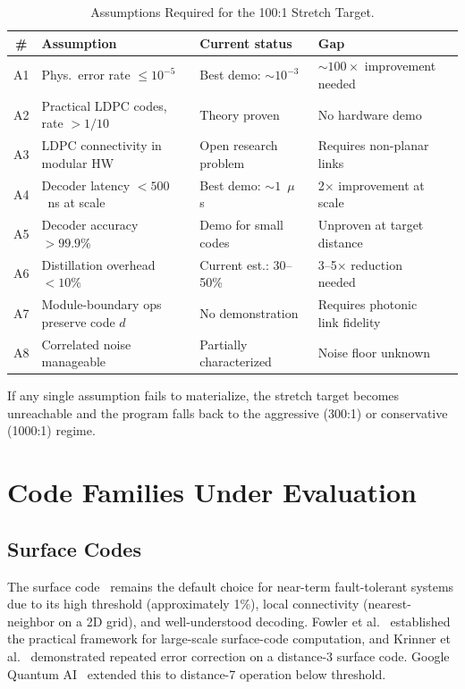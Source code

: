 \documentclass[conference]{IEEEtran}
\begin{document}
\begin{table}[htbp]
\centering
\caption{Assumptions Required for the 100:1 Stretch Target.}
\label{tab:assumptions}
\begin{tabular}{clllp{3cm}}
\toprule
\textbf{\#} & \textbf{Assumption} & \textbf{Current status} & \textbf{Gap} \\
\midrule
A1 & Phys.\ error rate $\leq 10^{-5}$ & Best demo: ${\sim}10^{-3}$~\cite{googleqai2024, krinner2022} & ${\sim}100\times$ improvement needed \\
A2 & Practical LDPC codes, rate $> 1/10$ & Theory proven~\cite{panteleev2022} & No hardware demo \\
A3 & LDPC connectivity in modular HW & Open research problem & Requires non-planar links \\
A4 & Decoder latency $< 500$~ns at scale & Best demo: ${\sim}1$~$\mu$s~\cite{googleqai2024} & 2$\times$ improvement at scale \\
A5 & Decoder accuracy $> 99.9\%$ & Demo for small codes~\cite{krinner2022} & Unproven at target distance \\
A6 & Distillation overhead $< 10\%$ & Current est.: 30--50\%~\cite{litinski2019} & 3--5$\times$ reduction needed \\
A7 & Module-boundary ops preserve code $d$ & No demonstration & Requires photonic link fidelity \\
A8 & Correlated noise manageable & Partially characterized~\cite{googleqai2024} & Noise floor unknown \\
\bottomrule
\end{tabular}
\end{table}

If any single assumption fails to materialize, the stretch target becomes unreachable and the program falls back to the aggressive (300:1) or conservative (1000:1) regime.

\section{Code Families Under Evaluation}

\subsection{Surface Codes}

The surface code~\cite{fowler2012, dennis2002} remains the default choice for near-term fault-tolerant systems due to its high threshold (approximately 1\%), local connectivity (nearest-neighbor on a 2D grid), and well-understood decoding. Fowler et al.~\cite{fowler2012} established the practical framework for large-scale surface-code computation, and Krinner et al.~\cite{krinner2022} demonstrated repeated error correction on a distance-3 surface code. Google Quantum AI~\cite{googleqai2024} extended this to distance-7 operation below threshold.
\end{document}
